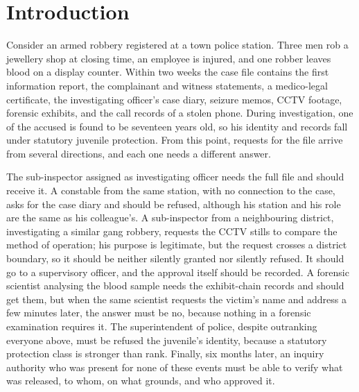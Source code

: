 
\section{Introduction}
\label{sec:intro}

Consider an armed robbery registered at a town police station. Three men rob a
jewellery shop at closing time, an employee is injured, and one robber leaves
blood on a display counter. Within two weeks the case file contains the first
information report, the complainant and witness statements, a medico-legal
certificate, the investigating officer's case diary, seizure memos, CCTV
footage, forensic exhibits, and the call records of a stolen phone. During
investigation, one of the accused is found to be seventeen years old, so his
identity and records fall under statutory juvenile protection. From this point,
requests for the file arrive from several directions, and each one needs a
different answer.

The sub-inspector assigned as investigating officer needs the full file and
should receive it. A constable from the same station, with no connection to the
case, asks for the case diary and should be refused, although his station and
his role are the same as his colleague's. A sub-inspector from a neighbouring
district, investigating a similar gang robbery, requests the CCTV stills to
compare the method of operation; his purpose is legitimate, but the request
crosses a district boundary, so it should be neither silently granted nor
silently refused. It should go to a supervisory officer, and the approval itself
should be recorded. A forensic scientist analysing the blood sample needs the
exhibit-chain records and should get them, but when the same scientist requests
the victim's name and address a few minutes later, the answer must be no,
because nothing in a forensic examination requires it. The superintendent of
police, despite outranking everyone above, must be refused the juvenile's
identity, because a statutory protection class is stronger than rank. Finally,
six months later, an inquiry authority who was present for none of these events
must be able to verify what was released, to whom, on what grounds, and who
approved it.

